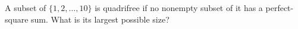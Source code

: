 A subset of $\{1,2,\ldots,10\}$ is quadrifree if no nonempty subset of it has a perfect-square sum. What is its largest possible size?
